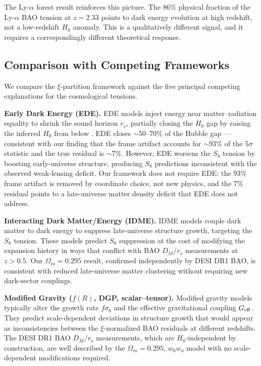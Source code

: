 \documentclass[twocolumn]{aastex631}
\begin{document}
The Ly-$\alpha$ forest result reinforces this picture.
The 86\% physical fraction of the Ly-$\alpha$ BAO tension at $z = 2.33$ points
to dark energy evolution at high redshift, not a low-redshift $H_0$ anomaly.
This is a qualitatively different signal, and it requires a correspondingly
different theoretical response.

\subsection{Comparison with Competing Frameworks}

We compare the $\xi$-partition framework against the five principal competing
explanations for the cosmological tensions.

\noindent\textbf{Early Dark Energy (EDE).}
EDE models inject energy near matter--radiation equality to shrink the sound
horizon $r_s$, partially closing the $H_0$ gap by raising the inferred $H_0$
from below \citep{Poulin2019}.
EDE closes $\sim$50--70\% of the Hubble gap --- consistent with our finding
that the frame artifact accounts for $\sim$93\% of the $5\sigma$ statistic
and the true residual is $\sim$7\%.
However, EDE worsens the $S_8$ tension by boosting early-universe structure,
producing $S_8$ predictions inconsistent with the observed weak-lensing deficit.
Our framework does not require EDE: the 93\% frame artifact is removed
by coordinate choice, not new physics, and the 7\% residual points to
a late-universe matter density deficit that EDE does not address.

\noindent\textbf{Interacting Dark Matter/Energy (IDME).}
IDME models couple dark matter to dark energy to suppress late-universe
structure growth, targeting the $S_8$ tension.
These models predict $S_8$ suppression at the cost of modifying the expansion
history in ways that conflict with BAO $D_M/r_s$ measurements at $z > 0.5$.
Our $\Omega_m = 0.295$ result, confirmed independently by DESI DR1 BAO,
is consistent with reduced late-universe matter clustering without requiring
new dark-sector couplings.

\noindent\textbf{Modified Gravity ($f(R)$, DGP, scalar--tensor).}
Modified gravity models typically alter the growth rate $f\sigma_8$ and the
effective gravitational coupling $G_{\rm eff}$.
They predict scale-dependent deviations in structure growth that would
appear as inconsistencies between the $\xi$-normalized BAO residuals at
different redshifts.
The DESI DR1 BAO $D_M/r_s$ measurements, which are $H_0$-independent
by construction, are well described by the $\Omega_m = 0.295$, $w_0 w_a$ model
with no scale-dependent modifications required.
\end{document}
